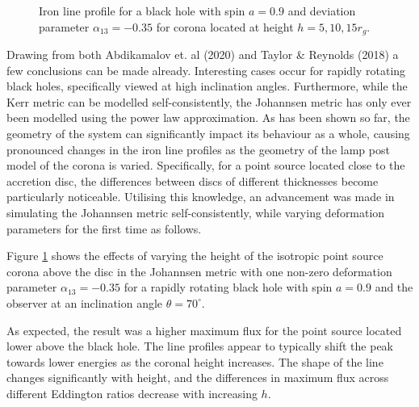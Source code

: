 \documentclass[fleqn,usenatbib,useAMS]{mnras}
\begin{document}
\begin{figure}
    \caption{Iron line profile for a black hole with spin $a = 0.9$ and deviation parameter $\alpha_{13} = -0.35$ for corona located at height $h = 5, 10, 15  r_{g}$.}
    \label{johannsen_selfconsistent}
\end{figure}

Drawing from both Abdikamalov et. al (2020)\cite{abdikamalov2020testing} and Taylor \& Reynolds (2018)\cite{taylor2018exploring} a few conclusions can be made already. Interesting cases occur for rapidly rotating black holes, specifically viewed at high inclination angles. Furthermore, while the Kerr metric can be modelled self-consistently, the Johannsen metric \cite{johannsen2013regular} has only ever been modelled using the power law approximation. As has been shown so far, the geometry of the system can significantly impact its behaviour as a whole, causing pronounced changes in the iron line profiles as the geometry of the lamp post model of the corona is varied. Specifically, for a point source located close to the accretion disc, the differences between discs of different thicknesses become particularly noticeable. 
Utilising this knowledge, an advancement was made in simulating the Johannsen metric self-consistently, while varying deformation parameters for the first time as follows.


Figure \ref{johannsen_selfconsistent} shows the effects of varying the height of the isotropic point source corona above the disc in the Johannsen metric with one non-zero deformation parameter $\alpha_{13} = -0.35$ for a rapidly rotating black hole with spin $a = 0.9$ and the observer at an inclination angle $\theta = 70^{\circ}$. 

As expected, the result was a higher maximum flux for the point source located lower above the black hole. The line profiles appear to typically shift the peak towards lower energies as the coronal height increases. The shape of the line changes significantly with height, and the differences in maximum flux across different Eddington ratios decrease with increasing $h$.
\end{document}
